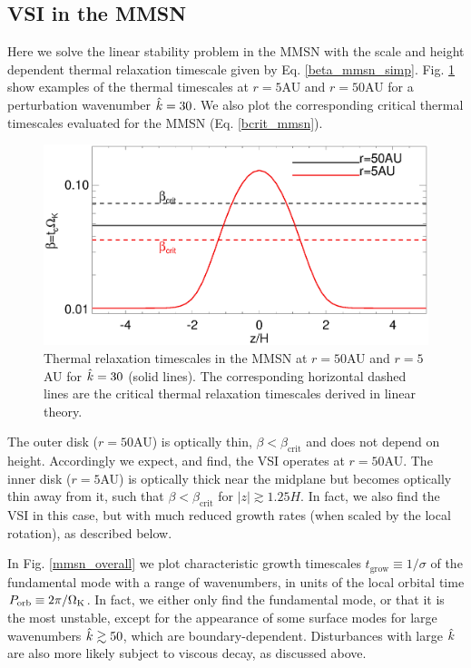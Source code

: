 \subsection{VSI in the MMSN}
Here we solve the linear stability problem in the MMSN with the scale and
height dependent thermal relaxation timescale given by
Eq. \ref{beta_mmsn_simp}.  Fig. \ref{beta_compare} show examples of
the thermal timescales at $r=5$AU and $r=50$AU for a
perturbation wavenumber $\hat{k}=30$. We also plot the 
corresponding critical thermal timescales evaluated for the MMSN
(Eq. \ref{bcrit_mmsn}).  
 \begin{figure}
  \includegraphics[width=\linewidth,clip=true,trim=0cm 0cm 0cm
  0cm]{figures/beta_compare}
  \caption{Thermal relaxation timescales in the MMSN at $r=50$AU
    and $r=5$AU for $\hat{k}=30$ (solid lines). The
    corresponding horizontal dashed lines are the critical thermal
    relaxation timescales derived in linear theory. 
    \label{beta_compare}}
\end{figure}

The outer disk ($r=50$AU) is optically thin,
$\beta<\beta_\mathrm{crit}$  and  does not depend on height.
Accordingly we expect, and find, the VSI operates at $r=50$AU. The
inner disk ($r=5$AU) is optically thick near the midplane but becomes
optically thin away from it, such that $\beta < \beta_\mathrm{crit}$
for $|z|\gtrsim1.25H$. In fact, we also find the VSI in this case, but
with much reduced growth rates (when scaled by the local rotation), as
described below.     

In Fig. \ref{mmsn_overall} we plot characteristic growth timescales
$t_\mathrm{grow} \equiv 1/\sigma$ of the fundamental mode with a range of
wavenumbers, in units of the local orbital time $P_\mathrm{orb}\equiv
2\pi/\Omega_{\rm K}$. In fact, we either only find the fundamental mode, or 
that it is the most unstable, except for the appearance of some 
surface modes for large wavenumbers $\hat{k}\gtrsim 50$, which are 
boundary-dependent.  
Disturbances with large $\hat{k}$ are also more likely subject to viscous 
decay, as discussed above. 



